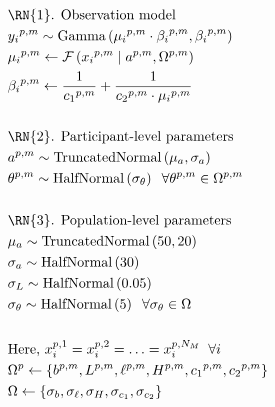 \documentclass[a4paper,12pt]{article}
\begin{document}
\begin{align*}
    &\text{\RN{1}. Observation model} \\
    &{y_i}^{p,m}\sim \text{Gamma}\left({\mu_i}^{p,m}\cdot{\beta_i}^{p,m}, {\beta_i}^{p,m}\right) \\
    &{\mu_i}^{p,m} \gets \mathcal{F}\left({x_i}^{p,m} \mid a^{p,m}, {\Omega}^{p,m}\right) \\
    &{\beta_i}^{p,m} \gets \frac1{{c_1}^{p,m}} + \frac1{{c_2}^{p,m}\cdot{\mu_i}^{p,m}}\\\\
    &\text{\RN{2}. Participant-level parameters} \\
    &a^{p,m} \sim \text{TruncatedNormal}\left({\mu_a}, {\sigma_a}\right)\\
    &{\theta}^{p,m} \sim \text{HalfNormal}\left({\sigma_{\theta}}\right) \;\;\forall \theta^{p,m} \in {\Omega}^{p,m}\\\\
    &\text{\RN{3}. Population-level parameters} \\
    & {\mu_a} \sim \text{TruncatedNormal}\left(50, 20\right)\\
    &{\sigma_a} \sim \text{HalfNormal}\left(30\right)\\
    &{\sigma_L} \sim \text{HalfNormal}\left(0.05\right)\\
    &{\sigma_\theta} \sim \text{HalfNormal}\left(5\right) \;\;\forall {\sigma_\theta}\in \Omega\\\\
    &\text{Here, } x_i^{p,1} = x_i^{p,2} = \ldots = x_i^{p,N_M} \;\;\forall i\\
    &{\Omega}^{p} \gets \left\{{b}^{p,m}, {L}^{p,m}, {\ell}^{p,m}, {H}^{p,m}, {c_1}^{p,m}, {c_2}^{p,m}\right\}\\
    &\Omega \gets \left\{{\sigma_{b}},  {\sigma_{\ell}}, {\sigma_{H}}, {\sigma_{c_1}}, {\sigma_{c_2}}\right\}\\
\end{align*}
\end{document}
